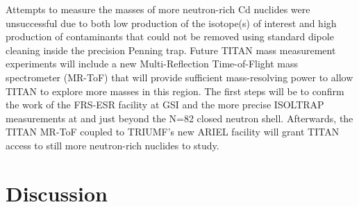 \documentclass[twocolumn,prc,showpacs,preprintnumbers,amsmath,amssymb,superscriptaddress,nofootinbib,aps,10pt]{revtex4-1}
\begin{document}

Attempts to measure the masses of more neutron-rich Cd nuclides were unsuccessful due to both low production of the isotope(s) of interest and high production of contaminants that could not be removed using standard dipole cleaning inside the precision Penning trap. Future TITAN mass measurement experiments will include a new Multi-Reflection Time-of-Flight mass spectrometer (MR-ToF) \cite{Jesch2015} that will provide sufficient mass-resolving power to allow TITAN to explore more masses in this region. The first steps will be to confirm the work of the FRS-ESR facility at GSI \cite{Knobel2016} and the more precise ISOLTRAP measurements \cite{Atanasov2015} at and just beyond the N=82 closed neutron shell. Afterwards, the TITAN MR-ToF coupled to TRIUMF's new ARIEL facility \cite{Dilling2014} will grant TITAN access to still more neutron-rich nuclides to study.

\section{Discussion}
\label{sec:conclusion}

\end{document}
